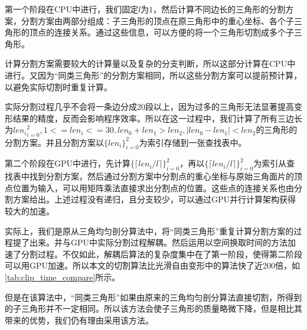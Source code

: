 第一个阶段在CPU中进行，我们固定$l$为$1$，然后计算不同边长的三角形的分割方案，分割方案由两部分组成：子三角形的顶点在原三角形中的重心坐标、各个子三角形的顶点的连接关系。通过这些信息，可以方便的将一个三角形切割成多个子三角形。

计算分割方案需要较大的计算量以及复杂的分支判断，所以这部分计算在CPU中进行。又因为“同类三角形”的分割方案相同，所以这些分割方案可以提前预计算，以避免实际切割时重复计算。

实际分割过程几乎不会将一条边分成20段以上，因为过多的三角形无法显著提高变形结果的精度，反而会影响程序效率。所以在这一过程中，我们计算了所有三边长为${len_i}^{2}_{i=0}, 1 <= len_i <= 30, len_0 + len_1 > len_2, |len_0 - len_1| < len_2$的三角形的分割方案。并且分割方案以$\{len_i\}^{2}_{i=0}$为索引存储到一张查找表中。


第二个阶段在GPU中进行，先计算$\{\lceil len_i/l \rceil\}^{2}_{i=0}$，再以$\{\lceil len_i/l \rceil\}^{2}_{i=0}$为索引从查找表中找到分割方案，然后通过分割方案中分割点的重心坐标与原始三角面片的顶点位置为输入，可以用矩阵乘法直接求出分割点的位置。这些点的连接关系也由分割方案给出。上述过程没有递归，且分支较少，可以通过GPU并行计算架构获得较大的加速。

实际上，我们是原从三角均匀剖分算法中，将“同类三角形”重复计算分割方案的过程提了出来。并与GPU中实际分割过程解耦。然后运用以空间换取时间的方法加速了分割过程。不仅如此，解耦后算法的复杂度集中在了第一阶段，使得第二阶段可以用GPU加速。所以本文的切割算法比光滑自由变形中的算法快了近200倍，如\autoref{tab:clip_time_compare}所示。


但是在该算法中，“同类三角形”如果由原来的三角均匀剖分算法直接切割，所得到的子三角形并不一定相同。所以该方法会使子三角形的质量略微下降，但是相比其带来的优势，我们仍有理由采用该方法。
